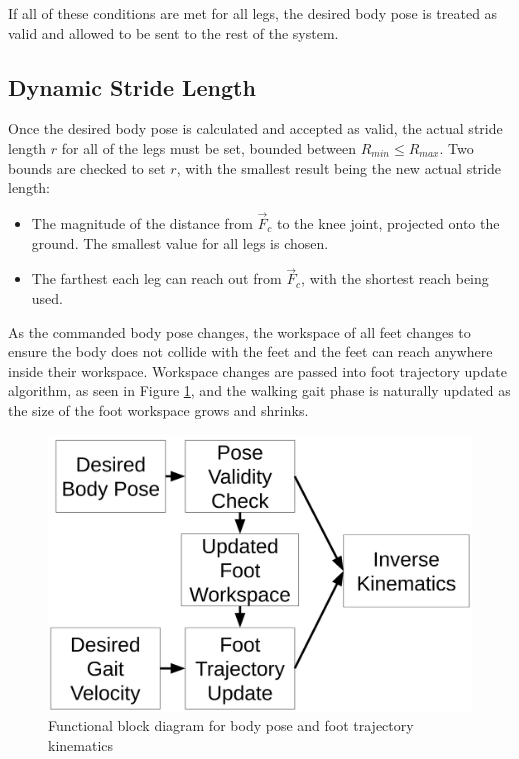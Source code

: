 If all of these conditions are met for all legs, the desired body pose is treated as valid and allowed to be sent to the rest of the system. 

\subsection{ Dynamic Stride Length }

Once the desired body pose is calculated and accepted as valid, the actual stride length $r$ for all of the legs must be set, bounded between $R_{min} \le R_{max}$. Two bounds are checked to set $r$, with the smallest result being the new actual stride length:

\begin{itemize}
    \item The magnitude of the distance from $\vec{F}_c$ to the knee joint, projected onto the ground. The smallest value for all legs is chosen.

    \item The farthest each leg can reach out from $\vec{F}_c$, with the shortest reach being used. 
\end{itemize}

As the commanded body pose changes, the workspace of all feet changes to ensure the body does not collide with the feet and the feet can reach anywhere inside their workspace. Workspace changes are passed into foot trajectory update algorithm, as seen in Figure \ref{fig:pose_kinematics_flow}, and the walking gait phase is naturally updated as the size of the foot workspace grows and shrinks. 

\begin{figure}[H]
    \centerline{\includegraphics[scale=0.095]{05_methods/figures/new_block_diagram.png}}
    \caption{Functional block diagram for body pose and foot trajectory kinematics}
    \label{fig:pose_kinematics_flow}
\end{figure}

